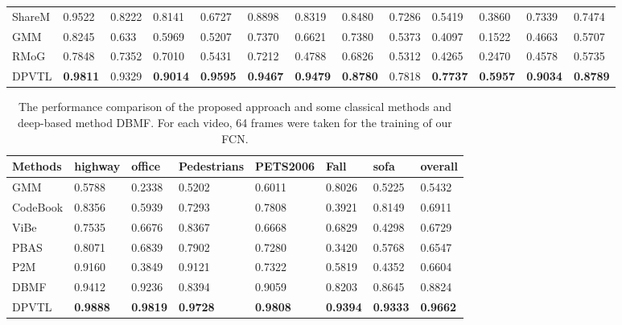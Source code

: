\documentclass[journal]{IEEEtran}
\begin{document}
\begin{table}[!t]
\begin{tabular}{lllllllllllll}
ShareM\cite{2015_ICME_ShareModel}      & 0.9522   & 0.8222  & 0.8141     & 0.6727    & 0.8898 & 0.8319  & 0.8480   & 0.7286     & 0.5419     & 0.3860 & 0.7339  & 0.7474  \\
GMM\cite{Zivkovic2004}         & 0.8245   & 0.633   & 0.5969     & 0.5207    & 0.7370 & 0.6621  & 0.7380   & 0.5373     & 0.4097     & 0.1522 & 0.4663  & 0.5707  \\
RMoG\cite{Varadarajan2013}        & 0.7848   & 0.7352  & 0.7010     & 0.5431    & 0.7212 & 0.4788  & 0.6826   & 0.5312     & 0.4265     & 0.2470 & 0.4578  & 0.5735  \\ \hline
DPVTL        & \textbf{0.9811}   & 0.9329  & \textbf{0.9014}     & \textbf{0.9595}    & \textbf{0.9467} & \textbf{0.9479}  & \textbf{0.8780}   & 0.7818     & \textbf{0.7737}     & \textbf{0.5957} & \textbf{0.9034}  & \textbf{0.8789} \\ \hline
\end{tabular}
\end{table}

\begin{table}[!t]
\centering
\caption{The performance comparison of the proposed approach and some classical methods and deep-based method DBMF. For each video, 64 frames were taken for the training of our FCN.}
\label{tab2}
\begin{tabular}{llllllll}
\hline
Methods  & highway & office & Pedestrians & PETS2006 & Fall   & sofa   & overall \\ \hline
GMM\cite{Stauffer1999}      & 0.5788  & 0.2338 & 0.5202      & 0.6011   & 0.8026 & 0.5225 & 0.5432  \\
CodeBook\cite{WU2010739} & 0.8356  & 0.5939 & 0.7293      & 0.7808   & 0.3921 & 0.8149 & 0.6911  \\
ViBe\cite{Barnich2011_2011_TIP}     & 0.7535  & 0.6676 & 0.8367      & 0.6668   & 0.6829 & 0.4298 & 0.6729  \\
PBAS\cite{Hofmann2012Background}     & 0.8071  & 0.6839 & 0.7902      & 0.7280   & 0.3420 & 0.5768 & 0.6547  \\
P2M\cite{Yang2016P2M}      & 0.9160  & 0.3849 & 0.9121      & 0.7322   & 0.5819 & 0.4352 & 0.6604  \\
DBMF\cite{Yang2018DBMF}     & 0.9412  & 0.9236 & 0.8394      & 0.9059   & 0.8203 & 0.8645 & 0.8824  \\ \hline
DPVTL     & \textbf{0.9888}  & \textbf{0.9819} & \textbf{0.9728}      & \textbf{0.9808}   & \textbf{0.9394} & \textbf{0.9333} & \textbf{0.9662}  \\ \hline
\end{tabular}
\end{table}
\end{document}
